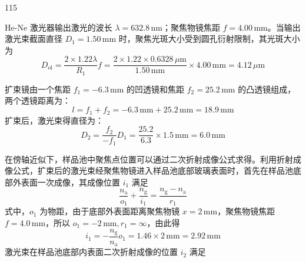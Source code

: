 \begin{solution}{115}
    \begin{subsolution}
        He-Ne 激光器输出激光的波长 $\lambda = 632.8 \,\mathrm{nm}$；聚焦物镜焦距 $f = 4.00 \,\mathrm{mm}$。当输出激光束截面直径 $D_{1} = 1.50 \,\mathrm{mm}$ 时，聚焦光斑大小受到圆孔衍射限制，其光斑大小为
        \begin{equation}
            D_{\mathrm{ol}} = \frac{2 \times 1.22 \lambda}{R_{1}} f = \frac{2 \times 1.22 \times 0.6328 \,\mu\mathrm{m}}{1.50 \,\mathrm{mm}} \times 4.00 \,\mathrm{mm} = 4.12 \,\mu\mathrm{m}
            \label{eq:1.s115}
        \end{equation}
    \end{subsolution}
    \begin{subsolution}
        扩束镜由一个焦距 $f_{1} = -6.3 \,\mathrm{mm}$ 的凹透镜和焦距 $f_{2} = 25.2 \,\mathrm{mm}$ 的凸透镜组成，两个透镜距离为：
        \begin{equation}
            l = f_{1} + f_{2} = -6.3 \,\mathrm{mm} + 25.2 \,\mathrm{mm} = 18.9 \,\mathrm{mm}
            \label{eq:2.s115}
        \end{equation}
        扩束后，激光束得直径为：
        \begin{equation}
            D_{2} = \frac{f_{2}}{-f_{1}} D_{1} = \frac{25.2}{6.3} \times 1.5 \,\mathrm{mm} = 6.0 \,\mathrm{mm}
            \label{eq:3.s115}
        \end{equation}
    \end{subsolution}
    \begin{subsolution}
        在傍轴近似下，样品池中聚焦点位置可以通过二次折射成像公式求得。利用折射成像公式，扩束后的激光束经聚焦物镜进入样品池底部玻璃表面时，首先在样品池底部外表面一次成像，其成像位置 $i_{1}$ 满足
        \begin{equation}
            \frac{n_{\mathrm{a}}}{o_{1}} + \frac{n_{\mathrm{g}}}{i_{1}} = \frac{n_{\mathrm{g}} - n_{\mathrm{a}}}{r_{1}}
            \label{eq:4.s115}
        \end{equation}
        式中，$o_{1}$ 为物距，由于底部外表面距离聚焦物镜 $x=2 \,\mathrm{mm}$，聚焦物镜焦距 $f=4.0 \,\mathrm{mm}$，所以 $o_{1}=-2 \,\mathrm{mm}, r_{1}=\infty$，由此得
        \begin{equation}
            i_{1} = - \frac{n_{\mathrm{g}}}{n_{\mathrm{a}}} o_{1} = 1.46 \times 2 \,\mathrm{mm} = 2.92 \,\mathrm{mm}
            \label{eq:5.s115}
        \end{equation}
        激光束在样品池底部内表面二次折射成像的位置 $i_{2}$ 满足
        \begin{equation}

\end{equation}
\end{subsolution}
\end{solution}
